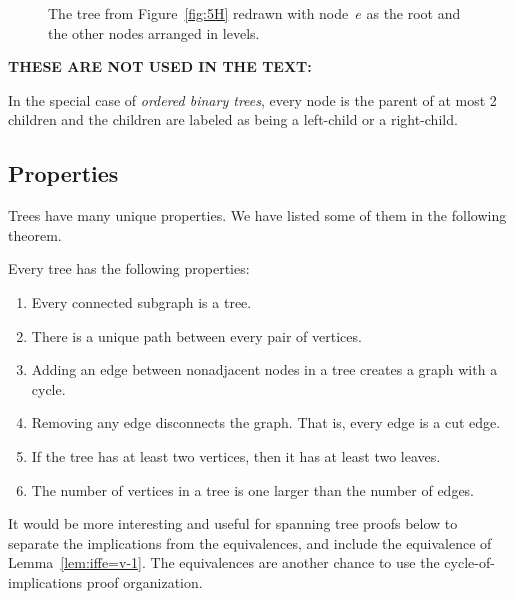 \begin{figure}


\caption{The tree from Figure~\ref{fig:5H} redrawn with node~$e$ as
  the root and the other nodes arranged in levels.}

\label{fig:5JJ}
\end{figure}

\begin{editingnotes}
\textbf{THESE ARE NOT USED IN THE TEXT:}

In the special case of \emph{ordered binary trees}, every node is the
parent of at most 2 children and the children are labeled as being a
left-child or a right-child.
\end{editingnotes}

\subsection{Properties}

Trees have many unique properties.  We have listed some of them in the
following theorem.

\begin{theorem}\label{th:treeprops}
Every tree has the following properties:

\begin{enumerate}

\item Every connected subgraph is a tree.\label{treeprops:asub}

\item There is a unique path between every pair of vertices.\label{treeprops:uniquepath}

\item Adding an edge between nonadjacent nodes in a tree creates a
  graph with a cycle.

\item Removing any edge disconnects the graph.  That is, every edge is
  a cut edge.

\item If the tree has at least two vertices, then it has at least two
  leaves.

\item\label{treeprops:v=e+1} The number of vertices in a tree is one larger than the number
  of edges.

\end{enumerate}
\end{theorem}

\begin{editingnotes}
It would be more interesting and useful for spanning tree proofs below
to separate the implications from the equivalences, and include the
equivalence of Lemma~\ref{lem:iffe=v-1}.  The equivalences are
another chance to use the cycle-of-implications proof organization.
\end{editingnotes}

